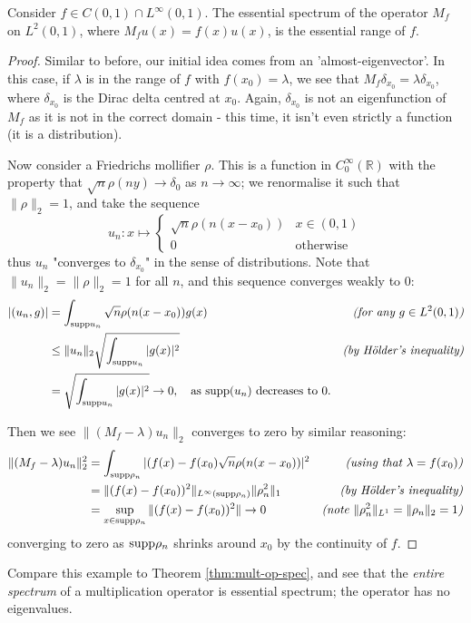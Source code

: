 \documentclass[../main.tex]{subfiles}
\begin{document}
\begin{example}
  Consider $f \in C(0, 1) \cap L^\infty (0, 1)$. The essential spectrum of the
  operator $M_f$ on $L^2(0, 1)$, where $M_f u(x) = f(x)u(x)$, is the essential range of $f$.
\end{example}
\begin{proof}
Similar to before, our initial idea comes from an 'almost-eigenvector'. In this
case, if $\lambda$ is in the range of $f$ with $f(x_0) = \lambda$, we
see that $M_f \delta_{x_0} = \lambda \delta_{x_0}$, where $\delta_{x_0}$
is the Dirac delta centred at $x_0$. Again, $\delta_{x_0}$ is not an eigenfunction of
$M_f$ as it is not in the correct domain - this time, it isn't even
strictly a function (it is a distribution).

Now consider a Friedrichs mollifier $\rho$. This is a function in
$C^\infty_0(\mathbb{R})$ with the property that $\sqrt{n}\rho(ny)
\rightarrow \delta_0$ as $n \rightarrow \infty$; we renormalise it such
that $\|\rho\|_2 = 1$, and take the sequence 
$$u_n: x \mapsto 
\begin{cases}
  \sqrt{n}\rho(n(x-x_0)) & x \in (0, 1) \\
  0 & \text{otherwise}
\end{cases}
$$
thus $u_n$ "converges to $\delta_{x_0}$" in the sense of distributions. Note
that $\|u_n\|_2 = \|\rho\|_2 = 1$ for all $n$, and this sequence
converges weakly to 0: 
\begin{align*}
|( u_n, g )| & = \int_{\mathrm{supp}{u_n}}\sqrt{n}\rho(n(x-x_0))g(x) 
	       & \text{\emph{(for any $g \in L^2(0, 1)$)}} \\
& \leq \|u_n\|_2 \sqrt{\int_{\mathrm{supp}{u_n}} |g(x)|^2} 
  & \text{\emph{(by H\"older's inequality)}} \\
& = \sqrt{\int_{\mathrm{supp}{u_n}} |g(x)|^2} \rightarrow 0, 
  \quad \text{as $\mathrm{supp}(u_n)$ decreases to 0.} &
\end{align*}

Then we see $\|(M_f - \lambda)u_n\|_2$ converges to zero by similar reasoning:
\begin{align*}
\|(M_f - \lambda)u_n\|^2_2 & = \int_{\mathrm{supp} \rho_n} |(f(x) - f(x_0) \sqrt{n} \rho(n(x-x_0))|^2 
			     & \text{\emph{(using that $\lambda = f(x_0)$)}} \\
& = \|(f(x) - f(x_0))^2\|_{L^\infty (\mathrm{supp} \rho_n)} \|\rho_n^2\|_1 
  & \text{\emph{(by H\"older's inequality)}} \\
& = \sup_{x \in \mathrm{supp} \rho_n} \|(f(x) - f(x_0))^2\| \rightarrow 0 
  & \text{\emph{(note $\|\rho_n^2\|_{L^1} = \|\rho_n\|_2 = 1$)}} \\
\end{align*}
converging to zero as $\mathrm{supp} \rho_n$ shrinks around $x_0$ by the continuity of $f$.
\end{proof}
Compare this example to Theorem \ref{thm:mult-op-spec}, and see that the
\emph{entire spectrum} of a multiplication operator is essential spectrum; the
operator has no eigenvalues.
\end{document}
